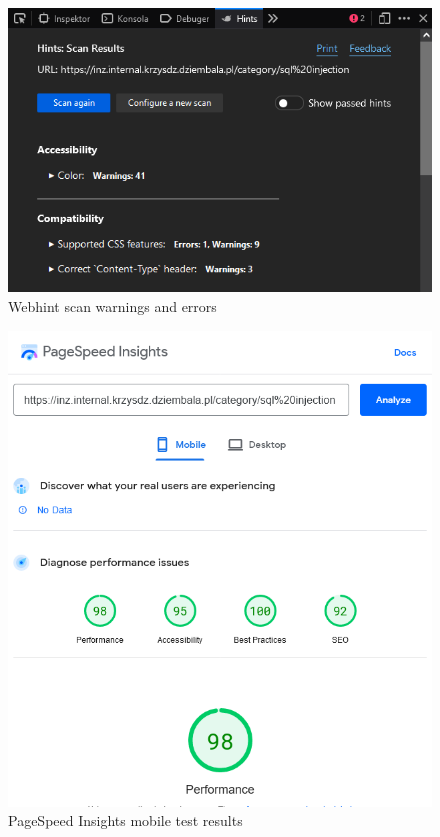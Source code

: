 \begin{figure}
	\centering
	\includegraphics{img/verify-webhint.png}
	\caption{Webhint scan warnings and errors}
	\label{fig:verify-webhint}
\end{figure}

\begin{figure}
	\centering
	\includegraphics[width=\textwidth]{img/verify-performance-mobile.png}
	\caption{PageSpeed Insights mobile test results}
	\label{fig:verify-perf}
\end{figure}

